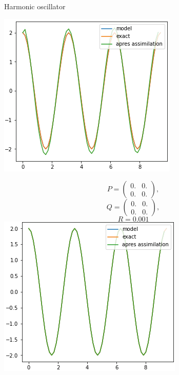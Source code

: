 \begin{frame}{Harmonic oscillator}
\begin{minipage}{.32\linewidth}
		\includegraphics[width=\linewidth]{"images/enkf/oscillator2_b.png"}
	\end{minipage} \;
	\begin{minipage}{.32\linewidth}
		\centering
		$$P=\begin{pmatrix}
			0. & 0. \\
			0. & 0. 
		\end{pmatrix} ,$$
		$$Q=\begin{pmatrix}
			0. & 0. \\
			0. & 0. 
		\end{pmatrix} ,$$
		$$R=0.001$$
		\includegraphics[width=\linewidth]{"images/enkf/oscillator3_b.png"}
	\end{minipage}


\end{frame}

